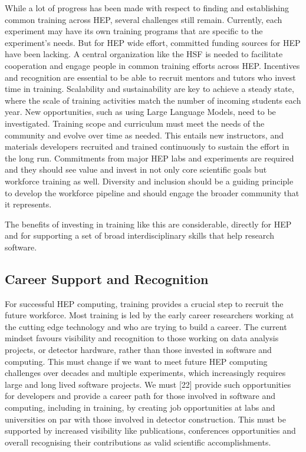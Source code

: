 While a lot of progress has been made with respect to finding and
establishing common training across HEP, several challenges still
remain. Currently, each experiment may have its own training programs
that are specific to the experiment's needs. But for HEP wide effort,
committed funding sources for HEP have been lacking. A central
organization like the HSF is needed to facilitate cooperation and engage
people in common training efforts across HEP. Incentives and recognition
are essential to be able to recruit mentors and tutors who invest time
in training. Scalability and sustainability are key to achieve a steady
state, where the scale of training activities match the number of
incoming students each year. New opportunities, such as using Large
Language Models, need to be investigated. Training scope and curriculum
must meet the needs of the community and evolve over time as needed.
This entails new instructors, and materials developers recruited and
trained continuously to sustain the effort in the long run. Commitments
from major HEP labs and experiments are required and they should see
value and invest in not only core scientific goals but workforce
training as well. Diversity and inclusion should be a guiding principle
to develop the workforce pipeline and should engage the broader
community that it represents.

The benefits of investing in training like this are considerable,
directly for HEP and for supporting a set of broad interdisciplinary
skills that help research software.

\subsection{Career Support and
Recognition}\label{career-support-and-recognition}

For successful HEP computing, training provides a crucial step to
recruit the future workforce. Most training is led by the early career
researchers working at the cutting edge technology and who are trying to
build a career. The current mindset favours visibility and recognition
to those working on data analysis projects, or detector hardware, rather
than those invested in software and computing. This must change if we
want to meet future HEP computing challenges over decades and multiple
experiments, which increasingly requires large and long lived software
projects. We must {[}22{]} provide such opportunities for developers and
provide a career path for those involved in software and computing,
including in training, by creating job opportunities at labs and
universities on par with those involved in detector construction. This
must be supported by increased visibility like publications, conferences
opportunities and overall recognising their contributions as valid
scientific accomplishments.

